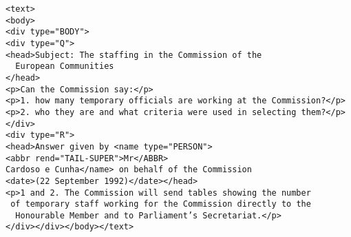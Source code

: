 \documentclass[a4paper,landscape,headrule,footrule,xetex]{foils}
\begin{document}

\begin{verbatim}
<text>
<body>
<div type="BODY">
<div type="Q">
<head>Subject: The staffing in the Commission of the 
  European Communities
</head>
<p>Can the Commission say:</p>
<p>1. how many temporary officials are working at the Commission?</p>
<p>2. who they are and what criteria were used in selecting them?</p>
</div>
<div type="R">
<head>Answer given by <name type="PERSON">
<abbr rend="TAIL-SUPER">Mr</ABBR>
Cardoso e Cunha</name> on behalf of the Commission 
<date>(22 September 1992)</date></head>
<p>1 and 2. The Commission will send tables showing the number
 of temporary staff working for the Commission directly to the 
  Honourable Member and to Parliament’s Secretariat.</p>
</div></div></body></text>
\end{verbatim}








\end{document}

